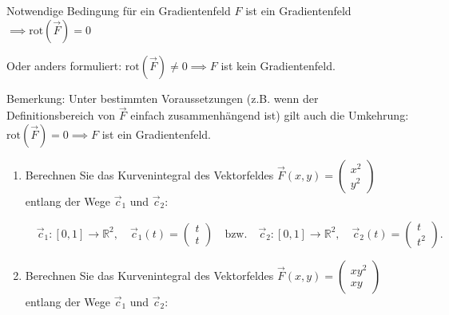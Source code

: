 \begin{satz}
    {Notwendige Bedingung für ein Gradientenfeld}{}
    \(F\) ist ein Gradientenfeld \(\implies \text{rot}(\vec{F}) = 0\)

    Oder anders formuliert: \(\text{rot}(\vec{F}) \neq 0 \implies F\) ist kein Gradientenfeld.
\end{satz}
Bemerkung: Unter bestimmten Voraussetzungen (z.B. wenn der Definitionsbereich von \(\vec{F}\) einfach zusammenhängend ist) gilt auch die Umkehrung: \(\text{rot}(\vec{F}) = 0 \implies F\) ist ein Gradientenfeld.
\clearpage
\begin{ueb}
    {}{}

    \begin{enumerate}
        \item Berechnen Sie das Kurvenintegral des Vektorfeldes \(\vec{F}(x,y)=\begin{pmatrix}
                  x^2 \\y^2
              \end{pmatrix}\) entlang der Wege \( \vec c_1 \) und \( \vec c_2 \):

              \[
                  \quad \vec c_1 : [0,1] \rightarrow \mathbb{R}^2, \quad \vec c_1(t) = \begin{pmatrix} t \\ t \end{pmatrix} \quad \text{bzw.} \quad \vec c_2 : [0,1] \rightarrow \mathbb{R}^2, \quad \vec c_2(t) = \begin{pmatrix} t \\ t^2 \end{pmatrix}.
              \]
        \item Berechnen Sie das Kurvenintegral des Vektorfeldes \(\vec{F}(x,y)=\begin{pmatrix}
                  xy^2 \\xy
              \end{pmatrix}\) entlang der Wege \( \vec c_1 \) und \(  \vec c_2 \):


\end{enumerate}
\end{ueb}
